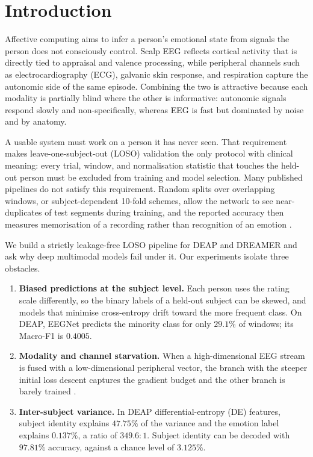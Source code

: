 \documentclass[a4paper,fleqn]{cas-sc}
\begin{document}
\section{Introduction}
\label{sec:intro}

Affective computing aims to infer a person's emotional state from signals the person does not consciously control. Scalp EEG reflects cortical activity that is directly tied to appraisal and valence processing, while peripheral channels such as electrocardiography (ECG), galvanic skin response, and respiration capture the autonomic side of the same episode. Combining the two is attractive because each modality is partially blind where the other is informative: autonomic signals respond slowly and non-specifically, whereas EEG is fast but dominated by noise and by anatomy.

A usable system must work on a person it has never seen. That requirement makes leave-one-subject-out (LOSO) validation the only protocol with clinical meaning: every trial, window, and normalisation statistic that touches the held-out person must be excluded from training and model selection. Many published pipelines do not satisfy this requirement. Random splits over overlapping windows, or subject-dependent 10-fold schemes, allow the network to see near-duplicates of test segments during training, and the reported accuracy then measures memorisation of a recording rather than recognition of an emotion \citep{li2022tutorial}.

We build a strictly leakage-free LOSO pipeline for DEAP \citep{koelstra2012deap} and DREAMER \citep{katsigiannis2018dreamer} and ask why deep multimodal models fail under it. Our experiments isolate three obstacles.

\begin{enumerate}
\item \textbf{Biased predictions at the subject level.} Each person uses the rating scale differently, so the binary labels of a held-out subject can be skewed, and models that minimise cross-entropy drift toward the more frequent class. On DEAP, EEGNet predicts the minority class for only $29.1\%$ of windows; its Macro-F1 is $0.4005$.
\item \textbf{Modality and channel starvation.} When a high-dimensional EEG stream is fused with a low-dimensional peripheral vector, the branch with the steeper initial loss descent captures the gradient budget and the other branch is barely trained \citep{pezeshki2021gradient,wang2020makes}.
\item \textbf{Inter-subject variance.} In DEAP differential-entropy (DE) features, subject identity explains $47.75\%$ of the variance and the emotion label explains $0.137\%$, a ratio of $349.6{:}1$. Subject identity can be decoded with $97.81\%$ accuracy, against a chance level of $3.125\%$.
\end{enumerate}
\end{document}
